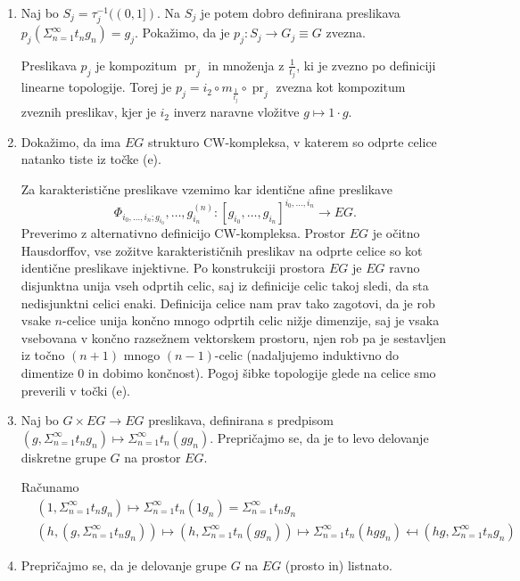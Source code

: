 \documentclass[a4paper, 12pt]{article}
\DeclareMathOperator{\pr}{pr}
\begin{document}
\begin{enumerate}[label=(\alph*)]
	\item Naj bo $S_j = \tau_j^{-1}((0, 1])$. Na $S_j$ je potem dobro definirana preslikava $p_j(\Sigma_{n = 1}^\infty t_ng_n) = g_j$. Pokažimo, da je $p_j \colon S_j \to G_j \equiv G$ zvezna.
	
	Preslikava $p_j$ je kompozitum $\pr_j$ in množenja z $\frac{1}{t_j}$, ki je zvezno po definiciji linearne topologije. Torej je $p_j = i_2 \circ m_{\frac{1}{t_j}} \circ \pr_j$ zvezna kot kompozitum zveznih preslikav, kjer je $i_2$ inverz naravne vložitve $g \mapsto 1 \cdot g$.
	
	\item Dokažimo, da ima $EG$ strukturo CW-kompleksa, v katerem so odprte celice natanko tiste iz točke (e).
	
	Za karakteristične preslikave vzemimo kar identične afine preslikave
	\[
	\Phi_{i_0, \dots, i_n; g_{i_0}}, \dots, g_{i_n}^{(n)} \colon [g_{i_0}, \dots, g_{i_n}]^{i_0, \dots, i_n} \to EG.
	\]
	Preverimo z alternativno definicijo CW-kompleksa. Prostor $EG$ je očitno Hausdorffov, vse zožitve karakterističnih preslikav na odprte celice so kot identične preslikave injektivne. Po konstrukciji prostora $EG$ je  $EG$ ravno disjunktna unija vseh odprtih celic, saj iz definicije celic takoj sledi, da sta nedisjunktni celici enaki. Definicija celice nam prav tako zagotovi, da je rob vsake $n$-celice unija končno mnogo odprtih celic nižje dimenzije, saj je vsaka vsebovana v končno razsežnem vektorskem prostoru, njen rob pa je sestavljen iz točno $(n+1)$ mnogo $(n-1)$-celic (nadaljujemo induktivno do dimentize $0$ in dobimo končnost). Pogoj šibke topologije glede na celice smo preverili v točki (e).
	
	\item Naj bo $G \times EG \to EG$ preslikava, definirana s predpisom $(g, \Sigma_{n = 1}^\infty t_n g_n) \mapsto \Sigma_{n = 1}^\infty t_n (gg_n)$. Prepričajmo se, da je to levo delovanje diskretne grupe $G$ na prostor $EG$.
	
	Računamo
	\begin{align*}
	&(1, \Sigma_{n = 1}^\infty t_ng_n) \mapsto \Sigma_{n = 1}^\infty t_n(1g_n) = \Sigma_{n = 1}^\infty t_ng_n\\
	& (h, (g, \Sigma_{n = 1}^\infty t_ng_n)) \mapsto (h, \Sigma_{n = 1}^\infty t_n(gg_n)) \mapsto \Sigma_{n = 1}^\infty t_n(hgg_n) \mapsfrom (hg, \Sigma_{n = 1}^\infty t_ng_n)
	\end{align*}
	
	\item Prepričajmo se, da je delovanje grupe $G$ na $EG$ (prosto in) listnato.
	

\end{enumerate}
\end{document}
